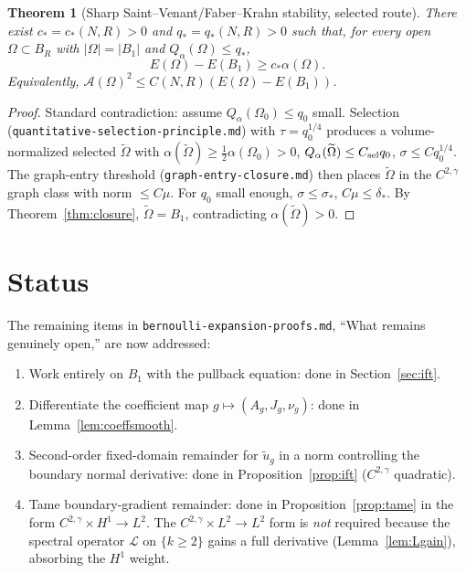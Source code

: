 \documentclass[11pt]{article}
\newtheorem{theorem}{Theorem}
\theoremstyle{definition}
\newcommand{\abs}[1]{\left|#1\right|}
\begin{document}
\begin{theorem}[Sharp Saint--Venant/Faber--Krahn stability, selected route]\label{thm:sharp}
There exist $c_*=c_*(N,R)>0$ and $q_*=q_*(N,R)>0$ such that, for every open
$\Omega\subset B_R$ with $\abs{\Omega}=\abs{B_1}$ and
$Q_\alpha(\Omega)\le q_*$,
\[
E(\Omega)-E(B_1)\ge c_*\alpha(\Omega).
\]
Equivalently, $\mathcal A(\Omega)^2\le C(N,R)(E(\Omega)-E(B_1))$.
\end{theorem}

\begin{proof}
Standard contradiction: assume $Q_\alpha(\Omega_0)\le q_0$ small. Selection
(\texttt{quantitative-selection-principle.md}) with $\tau=q_0^{1/4}$
produces a volume-normalized selected $\widetilde\Omega$ with
$\alpha(\widetilde\Omega)\ge\tfrac12\alpha(\Omega_0)>0$,
$Q_\alpha(\widetilde\Omega)\le C_{\rm sel}q_0$, $\sigma\le Cq_0^{1/4}$. The
graph-entry threshold (\texttt{graph-entry-closure.md}) then places
$\widetilde\Omega$ in the $C^{2,\gamma}$ graph class with norm $\le C\mu$.
For $q_0$ small enough, $\sigma\le\sigma_*$, $C\mu\le\delta_*$. By
Theorem~\ref{thm:closure}, $\widetilde\Omega=B_1$, contradicting
$\alpha(\widetilde\Omega)>0$.
\end{proof}

\section{Status}

The remaining items in \texttt{bernoulli-expansion-proofs.md}, ``What
remains genuinely open,'' are now addressed:
\begin{enumerate}
\item Work entirely on $B_1$ with the pullback equation: done in
Section~\ref{sec:ift}.
\item Differentiate the coefficient map $g\mapsto(A_g,J_g,\nu_g)$: done in
Lemma~\ref{lem:coeffsmooth}.
\item Second-order fixed-domain remainder for $\widetilde u_g$ in a norm
controlling the boundary normal derivative: done in
Proposition~\ref{prop:ift} ($C^{2,\gamma}$ quadratic).
\item Tame boundary-gradient remainder: done in Proposition~\ref{prop:tame}
in the form $C^{2,\gamma}\times H^1\to L^2$. The $C^{2,\gamma}\times L^2\to L^2$
form is \emph{not} required because the spectral operator $\mathcal L$ on
$\{k\ge2\}$ gains a full derivative (Lemma~\ref{lem:Lgain}), absorbing the
$H^1$ weight.
\end{enumerate}
\end{document}

